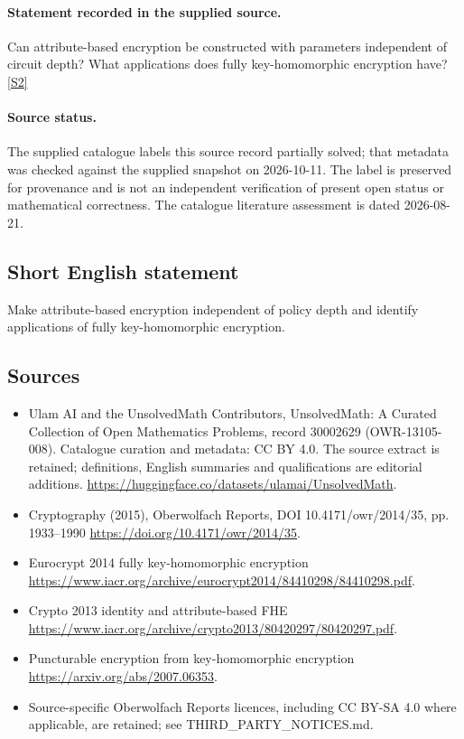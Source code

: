 \documentclass[11pt]{article}
\begin{document}
\paragraph{Statement recorded in the supplied source.}
Can attribute-based encryption be constructed with parameters independent of circuit depth? What applications does fully key-homomorphic encryption have? \href{https://doi.org/10.4171/owr/2014/35}{[S2]}
\paragraph{Source status.}
The supplied catalogue labels this source record partially solved; that metadata was checked against the supplied snapshot on 2026-10-11. The label is preserved for provenance and is not an independent verification of present open status or mathematical correctness. The catalogue literature assessment is dated 2026-08-21.
\subsection{Short English statement}
Make attribute-based encryption independent of policy depth and identify applications of fully key-homomorphic encryption.
\subsection{Sources}
\begin{itemize}
\item[S1] Ulam AI and the UnsolvedMath Contributors, UnsolvedMath: A Curated Collection of Open Mathematics Problems, record 30002629 (OWR-13105-008). Catalogue curation and metadata: CC BY 4.0. The source extract is retained; definitions, English summaries and qualifications are editorial additions.
\url{https://huggingface.co/datasets/ulamai/UnsolvedMath}.
\item[S2] Cryptography (2015), Oberwolfach Reports, DOI 10.4171/owr/2014/35, pp. 1933--1990
\url{https://doi.org/10.4171/owr/2014/35}.
\item[S3] Eurocrypt 2014 fully key-homomorphic encryption
\url{https://www.iacr.org/archive/eurocrypt2014/84410298/84410298.pdf}.
\item[S4] Crypto 2013 identity and attribute-based FHE
\url{https://www.iacr.org/archive/crypto2013/80420297/80420297.pdf}.
\item[S5] Puncturable encryption from key-homomorphic encryption
\url{https://arxiv.org/abs/2007.06353}.
\item Source-specific Oberwolfach Reports licences, including CC BY-SA 4.0 where applicable, are retained; see THIRD\_PARTY\_NOTICES.md.
\end{itemize}
\end{document}

